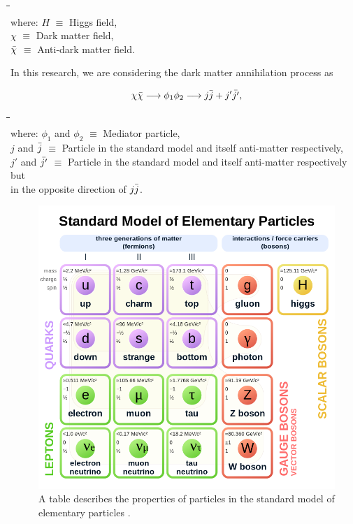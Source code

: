 \documentclass[10pt, oneside]{book}
\numberwithin{equation}{chapter}
\begin{document}
\begin{tabbing}
    \indent\= \indent\= \indent\= \indent\= \indent\=\\
    where:
    \>\>\> $H$ \> $\equiv$ Higgs field,\\
    \>\>\> $\chi$ \>$\equiv$ Dark matter field,\\
    \>\>\> $\Bar{\chi}$ \> $\equiv$ Anti-dark matter field.
\end{tabbing}

\noindent In this research, we are considering the dark matter annihilation process as

\begin{equation*}
    \chi\Bar{\chi} \longrightarrow \phi_1\phi_2 \longrightarrow j\Bar{j} + j'\Bar{j'},
\end{equation*}

\begin{tabbing}
    \indent\= \indent\= \indent\= \indent\= \indent\= \indent\= \indent\= \\
    where:
    \>\>\> $\phi_1$ and $\phi_2$ \>\>\>$\equiv$ \> Mediator particle,\\
    \>\>\> $j$ and $\Bar{j}$ \>\>\>$\equiv$ \> Particle in the standard model and itself anti-matter respectively,\\
    \>\>\> $j'$ and $\Bar{j'}$ \>\>\>$\equiv$ \> Particle in the standard model and itself anti-matter respectively but\\ \>\>\>\>\>\> in the opposite direction of $j\Bar{j}$.
\end{tabbing}

\begin{figure}
    \centering
    \includegraphics[width=\linewidth]{images/Standard_Model_of_Elementary_Particles.png}
    \caption{A table describes the properties of particles in the standard model of elementary particles \cite{enwiki:1199429080}.}
    \label{fig: standard model}
\end{figure}
\end{document}
